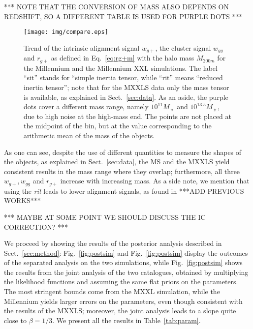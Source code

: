 \documentclass[a4paper,fleqn,usenatbib]{mnras}
\begin{document}
*** NOTE THAT THE CONVERSION OF MASS ALSO DEPENDS ON REDSHIFT, SO A DIFFERENT TABLE IS USED FOR PURPLE DOTS ***
\begin{figure}
	\centerline{
	\texttt{[image: img/compare.eps]}}
	\caption{Trend of the intrinsic alignment signal $w_{g+}$, the cluster signal $w_{gg}$ and $r_{g+}$ as defined in Eq.~\ref{eq:rg+m} with the halo mass $M_{200m}$ for the Millennium and the Millennium XXL simulations. The label ``sit'' stands for ``simple inertia tensor, while ``rit'' means ``reduced inertia tensor''; note that for the MXXLS data only the mass tensor is available, as explained in Sect.~\ref{sec:data}. As an aside, the purple dots cover a different mass range, namely $10^{11} M_{\sun}$ and $10^{13.5} M_{\sun}$, due to high noise at the high-mass end. The points are not placed at the midpoint of the bin, but at the value corresponding to the arithmetic mean of the mass of the objects.}
	\label{fig:vsmass}
\end{figure}
As one can see, despite the use of different quantities to measure the shapes of the objects, as explained in Sect.~\ref{sec:data}, the MS and the MXXLS yield consistent results in the mass range where they overlap; furthermore, all three $w_{g+}, w_{gg}$ and $r_{g+}$ increase with increasing mass. As a side note, we mention that using the \textit{rit} leads to lower alignment signals, as found in ***ADD PREVIOUS WORKS***

*** MAYBE AT SOME POINT WE SHOULD DISCUSS THE IC CORRECTION? ***

We proceed by showing the results of the posterior analysis described in Sect.~\ref{sec:method}: Fig.~\ref{fig:postsim}\protect{} and Fig.~\ref{fig:postsim}\protect{} display the outcomes of the separated analysis on the two simulations, while Fig.~\ref{fig:postsim}\protect{} shows the results from the joint analysis of the two catalogues, obtained by multiplying the likelihood functions and assuming the same flat priors on the parameters. The most stringent bounds come from the MXXL simulation, while the Millennium yields larger errors on the parameters, even though consistent with the results of the MXXLS; moreover, the joint analysis leads to a slope quite close to $\beta = 1/3$. We present all the results in Table~\ref{tab:param}.
\begin{figure*}
	\centerline{
	 }
	\centerline{	
	 }
	\caption{Posterior analysis for \protect{} the Millennium simulation, \protect{} the MXXL simulation and \protect{} joint MS and MXXLS. While the first one returns larger error bars, the results are compatible for the two catalogues; the exact values and errors of $A$ and $\beta$ are presented in Table~\ref{tab:param}.}
	\label{fig:postsim}
\end{figure*}
\end{document}

